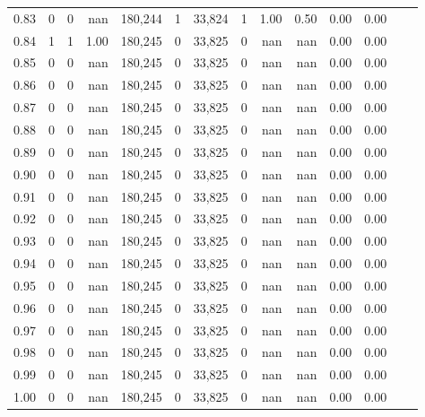 \begin{tabular}{rrrrrrrrrrrrrr}
0.83 &      0 &      0 &     nan &  180,244 &        1 &  33,824 &       1 &  1.00 &  0.50 &  0.00 &      0.00 \\
0.84 &      1 &      1 &    1.00 &  180,245 &        0 &  33,825 &       0 &   nan &   nan &  0.00 &      0.00 \\
0.85 &      0 &      0 &     nan &  180,245 &        0 &  33,825 &       0 &   nan &   nan &  0.00 &      0.00 \\
0.86 &      0 &      0 &     nan &  180,245 &        0 &  33,825 &       0 &   nan &   nan &  0.00 &      0.00 \\
0.87 &      0 &      0 &     nan &  180,245 &        0 &  33,825 &       0 &   nan &   nan &  0.00 &      0.00 \\
0.88 &      0 &      0 &     nan &  180,245 &        0 &  33,825 &       0 &   nan &   nan &  0.00 &      0.00 \\
0.89 &      0 &      0 &     nan &  180,245 &        0 &  33,825 &       0 &   nan &   nan &  0.00 &      0.00 \\
0.90 &      0 &      0 &     nan &  180,245 &        0 &  33,825 &       0 &   nan &   nan &  0.00 &      0.00 \\
0.91 &      0 &      0 &     nan &  180,245 &        0 &  33,825 &       0 &   nan &   nan &  0.00 &      0.00 \\
0.92 &      0 &      0 &     nan &  180,245 &        0 &  33,825 &       0 &   nan &   nan &  0.00 &      0.00 \\
0.93 &      0 &      0 &     nan &  180,245 &        0 &  33,825 &       0 &   nan &   nan &  0.00 &      0.00 \\
0.94 &      0 &      0 &     nan &  180,245 &        0 &  33,825 &       0 &   nan &   nan &  0.00 &      0.00 \\
0.95 &      0 &      0 &     nan &  180,245 &        0 &  33,825 &       0 &   nan &   nan &  0.00 &      0.00 \\
0.96 &      0 &      0 &     nan &  180,245 &        0 &  33,825 &       0 &   nan &   nan &  0.00 &      0.00 \\
0.97 &      0 &      0 &     nan &  180,245 &        0 &  33,825 &       0 &   nan &   nan &  0.00 &      0.00 \\
0.98 &      0 &      0 &     nan &  180,245 &        0 &  33,825 &       0 &   nan &   nan &  0.00 &      0.00 \\
0.99 &      0 &      0 &     nan &  180,245 &        0 &  33,825 &       0 &   nan &   nan &  0.00 &      0.00 \\
1.00 &      0 &      0 &     nan &  180,245 &        0 &  33,825 &       0 &   nan &   nan &  0.00 &      0.00 \\
\bottomrule
\end{tabular}
